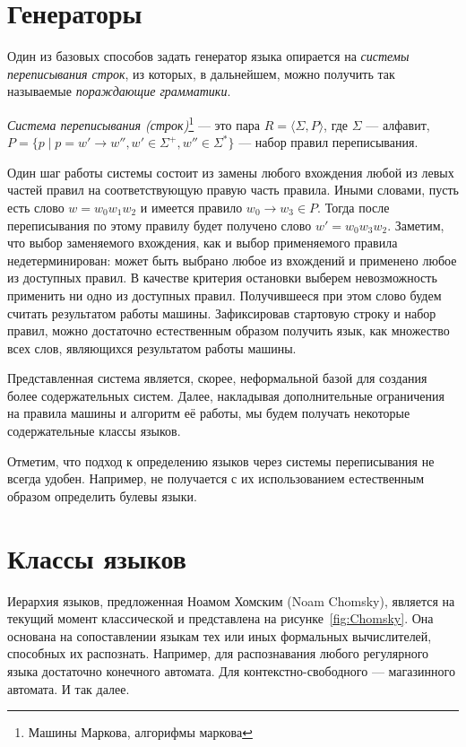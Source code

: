 \section{Генераторы}

Один из базовых способов задать генератор языка опирается на \textit{системы переписывания строк}, из которых, в дальнейшем, можно получить так называемые \textit{пораждающие грамматики}.

\begin{definition}
  \textit{Система переписывания (строк)}\footnote{Машины Маркова, алгорифмы маркова} --- это пара $R = \langle \Sigma, P  \rangle$, где $\Sigma$ --- алфавит, $P= \{p \mid p = w' \to w'', w' \in \Sigma^+, w'' \in \Sigma^*\}$ --- набор правил переписывания.
\end{definition}

Один шаг работы системы состоит из замены любого вхождения любой из левых частей правил на соответствующую правую часть правила.
Иными словами, пусть есть слово $w = w_0w_1w_2$ и имеется правило $w_0 \to w_3 \in P$.
Тогда после переписывания по этому правилу будет получено слово $w' = w_0w_3w_2$.
Заметим, что выбор заменяемого вхождения, как и выбор применяемого правила недетерминирован: может быть выбрано любое из вхождений и применено любое из доступных правил.
В качестве критерия остановки выберем невозможность применить ни одно из доступных правил.
Получившееся при этом слово будем считать результатом работы машины.
Зафиксировав стартовую строку и набор правил, можно достаточно естественным образом получить язык, как множество всех слов, являющихся результатом работы машины.

Представленная система является, скорее, неформальной базой для создания более содержательных систем.
Далее, накладывая дополнительные ограничения на правила машины и алгоритм её работы, мы будем получать некоторые содержательные классы языков.

Отметим, что подход к определению языков через системы переписывания не всегда удобен. Например, не получается с их использованием естественным образом определить булевы языки.


\section{Классы языков}

Иерархия языков, предложенная Ноамом Хомским (Noam Chomsky), является на текущий момент классической и представлена на рисунке~\ref{fig:Chomsky}.
Она основана на сопоставлении языкам тех или иных формальных вычислителей, способных их распознать. 
Например, для распознавания любого регулярного языка достаточно конечного автомата. Для контекстно-свободного --- магазинного автомата. И так далее.


